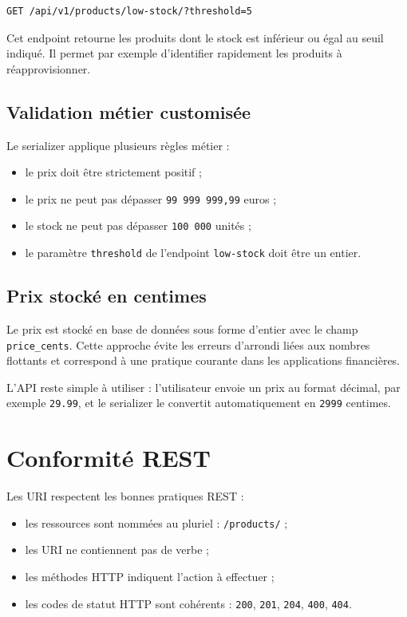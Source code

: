\documentclass[12pt,a4paper]{article}
\begin{document}
\begin{lstlisting}
GET /api/v1/products/low-stock/?threshold=5
\end{lstlisting}

Cet endpoint retourne les produits dont le stock est inférieur ou égal au seuil indiqué. Il permet par exemple d'identifier rapidement les produits à réapprovisionner.

\subsection{Validation métier customisée}

Le serializer applique plusieurs règles métier :

\begin{itemize}
    \item le prix doit être strictement positif ;
    \item le prix ne peut pas dépasser \texttt{99 999 999,99} euros ;
    \item le stock ne peut pas dépasser \texttt{100 000} unités ;
    \item le paramètre \texttt{threshold} de l'endpoint \texttt{low-stock} doit être un entier.
\end{itemize}

\subsection{Prix stocké en centimes}

Le prix est stocké en base de données sous forme d'entier avec le champ \texttt{price\_cents}. Cette approche évite les erreurs d'arrondi liées aux nombres flottants et correspond à une pratique courante dans les applications financières.

L'API reste simple à utiliser : l'utilisateur envoie un prix au format décimal, par exemple \texttt{29.99}, et le serializer le convertit automatiquement en \texttt{2999} centimes.

\section{Conformité REST}

Les URI respectent les bonnes pratiques REST :

\begin{itemize}
    \item les ressources sont nommées au pluriel : \texttt{/products/} ;
    \item les URI ne contiennent pas de verbe ;
    \item les méthodes HTTP indiquent l'action à effectuer ;
    \item les codes de statut HTTP sont cohérents : \texttt{200}, \texttt{201}, \texttt{204}, \texttt{400}, \texttt{404}.
\end{itemize}
\end{document}
